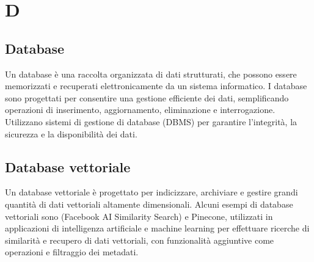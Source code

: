 \section{D}

\vspace{2em}
\subsection*{Database}
\par Un database è una raccolta organizzata di dati strutturati, che possono essere memorizzati e recuperati elettronicamente da un sistema informatico. I database sono progettati per consentire una gestione efficiente dei dati, semplificando operazioni di inserimento, aggiornamento, eliminazione e interrogazione. Utilizzano sistemi di gestione di database (DBMS) per garantire l'integrità, la sicurezza e la disponibilità dei dati.

\vspace{2em}
\subsection*{Database vettoriale}
\par Un database vettoriale è progettato per indicizzare, archiviare e gestire grandi quantità di dati vettoriali altamente dimensionali. Alcuni esempi di database vettoriali sono  (Facebook AI Similarity Search) e Pinecone, utilizzati in applicazioni di intelligenza artificiale e machine learning per effettuare ricerche di similarità e recupero di dati vettoriali, con funzionalità aggiuntive come operazioni  e filtraggio dei metadati.


